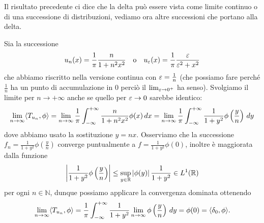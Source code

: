 Il risultato precedente ci dice che la delta può essere vista come limite continuo o di una successione di distribuzioni, vediamo ora altre 
successioni che portano alla delta. 
\begin{example} \label{exa: successione che converge alla delta}
  Sia la successione
  \begin{align}
    u_n(x) = \frac1{\pi} \frac{n}{1 + n^2x^2} \quad \textnormal{o} \quad u_\varepsilon(x) = \frac1{\pi} \frac{\varepsilon}{\varepsilon^2 + x^2} 
  \end{align}
  che abbiamo riscritto nella versione continua con $ \varepsilon = \frac1{n} $ (che possiamo fare perché $ \frac1{n} $ ha un punto di accumulazione in $ 0 $ 
  perciò il $ \lim_{\varepsilon \to 0^+} $ ha senso). Svolgiamo il limite per $ n\to +\infty $ anche se quello per $ \varepsilon \to 0 $ sarebbe identico:
  \begin{align}
    \lim_{n \to \infty} \sc{T_{u_n}, \phi} = \lim_{n\to \infty} \frac1{\pi} \int_{-\infty}^{+\infty} \frac{n}{1 + n^2x^2} \phi(x) \, dx 
    = \lim_{n\to \infty} \frac1{\pi} \int_{-\infty}^{+\infty} \frac1{1 + y^2}\phi \left( \frac{y}{n} \right) \,dy
  \end{align}
  dove abbiamo usato la sostituzione $ y = nx $. Osserviamo che la successione $ f_n = \frac1{1 + y^2} \phi\left( \frac{y}{n} \right) $ converge 
  puntualmente a $ f = \frac1{1+y^2} \phi\left( 0 \right) $, inoltre è maggiorata dalla funzione
  \begin{align}
    \abs{\frac1{1 + y^2} \phi\left( \frac{y}{n} \right)} \leq \sup_{y\in \R} \abs{\phi(y)} \frac1{1+y^2} \in L^1(\R)
  \end{align}
  per ogni $ n \in \mathbb{N} $, dunque possiamo applicare la convergenza dominata ottenendo 
  \begin{align}
    \lim_{n\to \infty} \sc{T_{u_n}, \phi} = \frac1{\pi} \int_{-\infty}^{+\infty} \frac1{1+y^2} \lim_{n\to \infty} \phi \left( \frac{y}{n} \right) \,dy 
    = \phi(0) = \sc{\delta_0, \phi}.
  \end{align}
\end{example}

